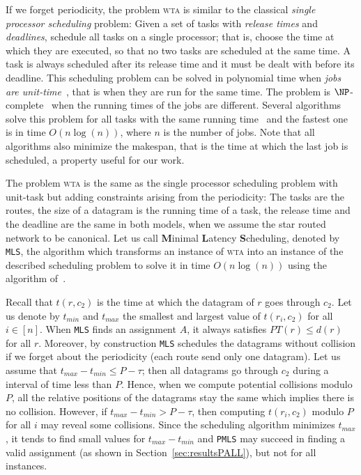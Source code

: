 \documentclass[a4paper,10pt]{journal}
\newcommand\MLS{\texttt{MLS}\xspace}
\newcommand\PMLS{\texttt{PMLS}\xspace}
\newcommand\wta{\textsc{wta}\xspace}
\begin{document}
     
     If we forget periodicity, the problem \wta is similar to the classical \emph{single processor scheduling} problem: Given a set of tasks with \emph{release times} and \emph{deadlines}, schedule all tasks on a single processor; that is, choose the time at which they are executed, so that no two tasks are scheduled at the same time. A task is always scheduled after its release time and it must be dealt with before its deadline. This scheduling problem can be solved in polynomial time when \emph{jobs are unit-time}~\cite{simons1978fast}, that is when they are run for the same time.
     The problem is $\NP$-complete~\cite{lenstra1977complexity} when the running times of the jobs are different. Several algorithms solve this problem
     for all tasks with the same running time~\cite{simons1978fast,carlier1979probleme,garey1981scheduling} and the fastest one is in time $O(n\log(n))$, where $n$ is the number of jobs.
     Note that all algorithms also minimize the makespan, that is the time at which the last job is scheduled, a property useful for our work. 

     The problem \wta is the same as the single processor scheduling problem with unit-task but adding constraints arising from
     the periodicity: The tasks are the routes, the size of a datagram is the running time of a task, 
     the release time and the deadline are the same in both models, when we assume the star routed network to be canonical.
	 Let us call \textbf{M}inimal \textbf{L}atency \textbf{S}cheduling, denoted by \MLS, the algorithm which transforms an instance of \wta into an instance of the described scheduling problem to solve it in time $O(n\log(n))$ using the algorithm of~\cite{garey1981scheduling}.
     
     Recall that $t(r,c_2)$ is the time at which the datagram of $r$ goes through $c_2$. Let us denote by $t_{min}$ and $t_{max}$ the smallest and largest value of $t(r_i,c_2)$ for all $i \in[n]$. When \MLS finds an assignment $A$, it always satisfies $PT(r) \leq d(r)$ for all $r$. Moreover, by construction \MLS schedules the datagrams without collision if we forget about the periodicity (each route send only one datagram). Let us assume that $t_{max}- t_{min} \leq P -\tau $; then all datagrams go through $c_2$ during a interval of time less than $P$. Hence, when we compute potential collisions modulo $P$, all the relative positions of the datagrams stay the same which implies there is no collision. However, if $t_{max}- t_{min} > P -\tau $, then computing $t(r_i,c_2)$ modulo $P$ for all $i$ may reveal some collisions. Since the scheduling algorithm minimizes $t_{max}$, it tends to find  small values for $t_{max} - t_{min}$ and \PMLS may succeed in finding a valid assignment (as shown in Section~\ref{sec:resultsPALL}), but not for all instances. 
     
\end{document}
